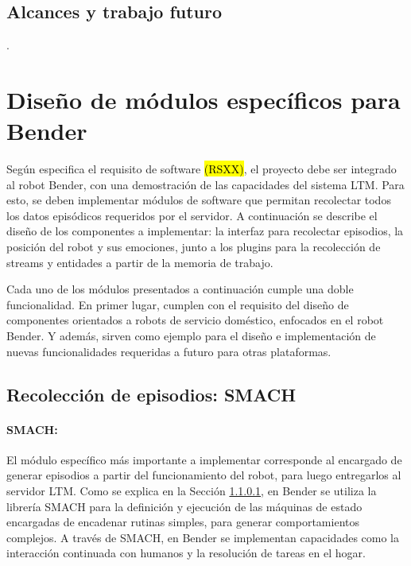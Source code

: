 \subsection{Alcances y trabajo futuro}
 .


\section{Diseño de módulos específicos para Bender}

Según especifica el requisito de software \hl{(RSXX)}, el proyecto debe ser integrado al robot Bender, con una demostración de las capacidades del sistema LTM. Para esto, se deben implementar módulos de software que permitan recolectar todos los datos episódicos requeridos por el servidor. A continuación se describe el diseño de los componentes a implementar: la interfaz para recolectar episodios, la posición del robot y sus emociones, junto a los plugins para la recolección de streams y entidades a partir de la memoria de trabajo. 

Cada uno de los módulos presentados a continuación cumple una doble funcionalidad. En primer lugar, cumplen con el requisito del diseño de componentes orientados a robots de servicio doméstico, enfocados en el robot Bender. Y además, sirven como ejemplo para el diseño e implementación de nuevas funcionalidades requeridas a futuro para otras plataformas.


\subsection{Recolección de episodios: SMACH}

\paragraph{SMACH:}
El módulo específico más importante a implementar corresponde al encargado de generar episodios a partir del funcionamiento del robot, para luego entregarlos al servidor LTM. Como se explica en la Sección \ref{}, en Bender se utiliza la librería SMACH para la definición y ejecución de las máquinas de estado encargadas de encadenar rutinas simples, para generar comportamientos complejos. A través de SMACH, en Bender se implementan capacidades como la interacción continuada con humanos y la resolución de tareas en el hogar. 

